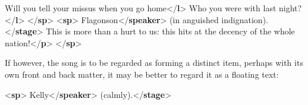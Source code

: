 \begin{shaded}
\hspace*{1em}Will you tell your missus when you go home{</\textbf{l}>}\mbox{}\newline 
\hspace*{1em}Who you were with last night?{</\textbf{l}>}\mbox{}\newline 
{}\mbox{}\newline 
{</\textbf{sp}>}\mbox{}\newline 
{<\textbf{sp}>}\mbox{}\newline 
{}Flagonson{</\textbf{speaker}>}\mbox{}\newline 
{}(in anguished indignation).{</\textbf{stage}>}\mbox{}\newline 
{}This is more than a hurt to us: this hits at the\mbox{}\newline 
\hspace*{1em}\hspace*{1em} decency of the whole nation!{</\textbf{p}>}\mbox{}\newline 
{</\textbf{sp}>}\end{shaded}\egroup\par \noindent  If however, the song is to be regarded as forming a distinct item, perhaps with its own front and back matter, it may be better to regard it as a floating text: \par\bgroup{}\exampleFont \begin{shaded}\noindent\mbox{}{<\textbf{sp}>}\mbox{}\newline 
{}Kelly{</\textbf{speaker}>}\mbox{}\newline 
{}(calmly).{</\textbf{stage}>}\mbox{}\newline 

\end{shaded}
